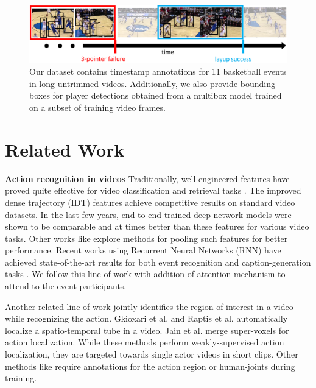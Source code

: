 
\begin{figure}[ht!]
  \includegraphics[width=6.5 in]{images/dataset_figure_cropped.pdf}
  \caption{Our dataset contains timestamp annotations for 11 basketball events
    in long untrimmed videos. Additionally, we also provide bounding boxes for player
    detections obtained from a multibox model trained on a subset of training
  video frames.}
\end{figure}



\section{Related Work}

\noindent \textbf{Action recognition in videos}
Traditionally, well engineered features have proved quite effective for video
classification and retrieval tasks
\cite{Dalal_ECCV06,Jain_CVPR13,Jiang_ECCV12,Laptev_CVPR08,
Niebels_ECCV10,Oh_MVA14,Oneata_ICCV13,Peng_ECCV14,Sadanand_CVPR12,Schuldt_ICPR04,Wang_BMVC09,Wang_CVPR11}.
The improved dense trajectory (IDT) features \cite{Wang_CVPR11} achieve
competitive results on standard video datasets.  In the last few years,
end-to-end trained deep network models
\cite{Ji_PAMI13,Karpathy_CVPR14,Simonyan_2014,Simonyan_NIPS14,Tran_arxiv14} were shown to be comparable and
at times better than these features for various video tasks.  Other works like
\cite{Wang_arxiv15,Xu_2015,Zha_2015} explore methods for pooling such
features for better performance. Recent works using Recurrent Neural Networks (RNN) have achieved
state-of-the-art results for both event recognition and caption-generation
tasks \cite{Donahue_arxiv14,Ng_arxiv15,Srivastava_2015,Yao_arxiv15}.
We follow this line of work with addition of attention mechanism
to attend to the event participants.

Another related line of work jointly identifies the region of interest in a video
while recognizing the action.
Gkioxari et al.  \cite{Gkioxari_arxiv14} and Raptis et al.  \cite{Raptis_CVPR12}
automatically localize a spatio-temporal tube in a video.
Jain et al. \cite{Jain_CVPR14} merge super-voxels for action localization.
While these methods perform weakly-supervised action localization, they are targeted
towards single actor videos in short clips.
Other methods like \cite{Lan_ICCV11,Prest_PAMI13,Tian_CVPR13,Wang_ECCV14} require annotations
for the action region or human-joints during training.

